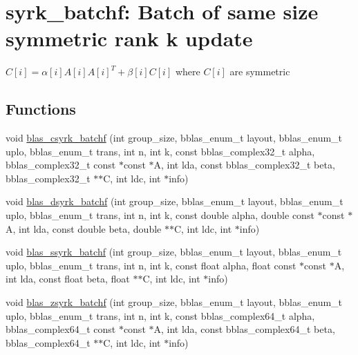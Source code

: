 \hypertarget{group__syrk__batchf}{}\section{syrk\+\_\+batchf\+: Batch of same size symmetric rank k update}
\label{group__syrk__batchf}


$ C[i] = \alpha[i] A[i] A[i]^T + \beta[i] C[i] $ where $ C[i] $ are symmetric  


\subsection*{Functions}
\begin{DoxyCompactItemize}
\item 
void \mbox{\hyperlink{group__syrk__batchf_ga9febfef5913e417a169253881b64e423}{blas\+\_\+csyrk\+\_\+batchf}} (int group\+\_\+size, bblas\+\_\+enum\+\_\+t layout, bblas\+\_\+enum\+\_\+t uplo, bblas\+\_\+enum\+\_\+t trans, int n, int k, const bblas\+\_\+complex32\+\_\+t alpha, bblas\+\_\+complex32\+\_\+t const $\ast$const $\ast$A, int lda, const bblas\+\_\+complex32\+\_\+t beta, bblas\+\_\+complex32\+\_\+t $\ast$$\ast$C, int ldc, int $\ast$info)
\item 
void \mbox{\hyperlink{group__syrk__batchf_gaf7aebb3698636b020b8c6b5a09715011}{blas\+\_\+dsyrk\+\_\+batchf}} (int group\+\_\+size, bblas\+\_\+enum\+\_\+t layout, bblas\+\_\+enum\+\_\+t uplo, bblas\+\_\+enum\+\_\+t trans, int n, int k, const double alpha, double const $\ast$const $\ast$A, int lda, const double beta, double $\ast$$\ast$C, int ldc, int $\ast$info)
\item 
void \mbox{\hyperlink{group__syrk__batchf_ga1406866a70d2f1b721b114c517f503dd}{blas\+\_\+ssyrk\+\_\+batchf}} (int group\+\_\+size, bblas\+\_\+enum\+\_\+t layout, bblas\+\_\+enum\+\_\+t uplo, bblas\+\_\+enum\+\_\+t trans, int n, int k, const float alpha, float const $\ast$const $\ast$A, int lda, const float beta, float $\ast$$\ast$C, int ldc, int $\ast$info)
\item 
void \mbox{\hyperlink{group__syrk__batchf_gaeec75ae41dc2d56a6de96e5407d83ad2}{blas\+\_\+zsyrk\+\_\+batchf}} (int group\+\_\+size, bblas\+\_\+enum\+\_\+t layout, bblas\+\_\+enum\+\_\+t uplo, bblas\+\_\+enum\+\_\+t trans, int n, int k, const bblas\+\_\+complex64\+\_\+t alpha, bblas\+\_\+complex64\+\_\+t const $\ast$const $\ast$A, int lda, const bblas\+\_\+complex64\+\_\+t beta, bblas\+\_\+complex64\+\_\+t $\ast$$\ast$C, int ldc, int $\ast$info)
\end{DoxyCompactItemize}


